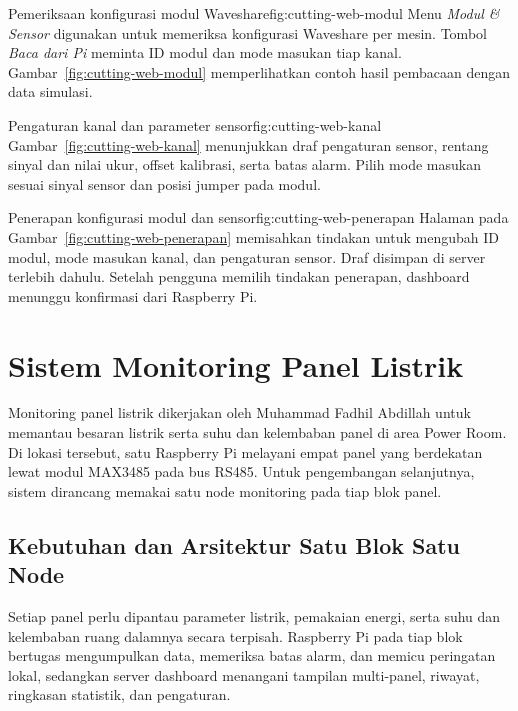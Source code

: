   {Pemeriksaan konfigurasi modul Waveshare}{fig:cutting-web-modul}
  {Menu \textit{Modul \& Sensor} digunakan untuk memeriksa konfigurasi Waveshare per mesin. Tombol \textit{Baca dari Pi} meminta ID modul dan mode masukan tiap kanal. Gambar~\ref{fig:cutting-web-modul} memperlihatkan contoh hasil pembacaan dengan data simulasi.}

  {Pengaturan kanal dan parameter sensor}{fig:cutting-web-kanal}
  {Gambar~\ref{fig:cutting-web-kanal} menunjukkan draf pengaturan sensor, rentang sinyal dan nilai ukur, offset kalibrasi, serta batas alarm. Pilih mode masukan sesuai sinyal sensor dan posisi jumper pada modul.}

  {Penerapan konfigurasi modul dan sensor}{fig:cutting-web-penerapan}
  {Halaman pada Gambar~\ref{fig:cutting-web-penerapan} memisahkan tindakan untuk mengubah ID modul, mode masukan kanal, dan pengaturan sensor. Draf disimpan di server terlebih dahulu. Setelah pengguna memilih tindakan penerapan, dashboard menunggu konfirmasi dari Raspberry Pi.}
\endgroup

\section{Sistem Monitoring Panel Listrik}
\label{sec:monitoring-panel}

Monitoring panel listrik dikerjakan oleh Muhammad Fadhil Abdillah untuk memantau besaran listrik serta suhu dan kelembaban panel di area Power Room. Di lokasi tersebut, satu Raspberry Pi melayani empat panel yang berdekatan lewat modul MAX3485 pada bus RS485. Untuk pengembangan selanjutnya, sistem dirancang memakai satu node monitoring pada tiap blok panel.

\subsection{Kebutuhan dan Arsitektur Satu Blok Satu Node}

Setiap panel perlu dipantau parameter listrik, pemakaian energi, serta suhu dan kelembaban ruang dalamnya secara terpisah. Raspberry Pi pada tiap blok bertugas mengumpulkan data, memeriksa batas alarm, dan memicu peringatan lokal, sedangkan server dashboard menangani tampilan multi-panel, riwayat, ringkasan statistik, dan pengaturan.


